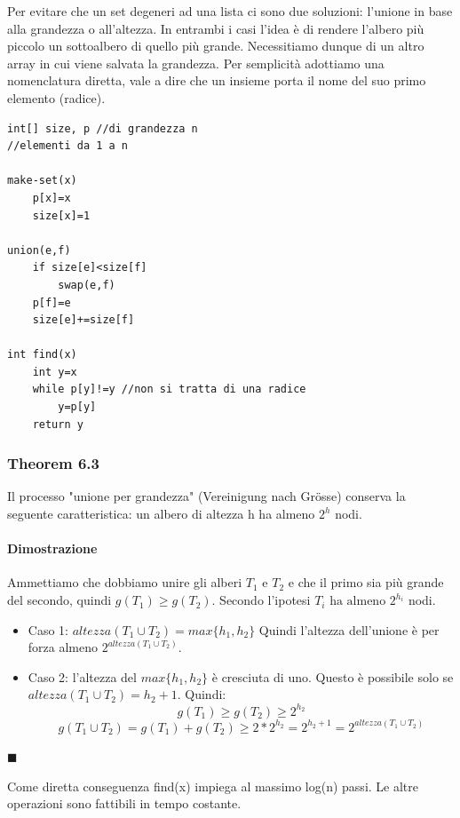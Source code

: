 \documentclass[a4paper]{book}
\newenvironment{mytheorem}[1]{\subsubsection*{Theorem #1}}{\begin{flushright}$\blacksquare$\end{flushright}}
\begin{document}
Per evitare che un set degeneri ad una lista ci sono due soluzioni: l'unione in base alla grandezza o all'altezza. In entrambi i casi l'idea è di rendere l'albero più piccolo un sottoalbero di quello più grande. Necessitiamo dunque di un altro array in cui viene salvata la grandezza. Per semplicità adottiamo una nomenclatura diretta, vale a dire che un insieme porta il nome del suo primo elemento (radice).
\begin{lstlisting}
int[] size, p //di grandezza n
//elementi da 1 a n

make-set(x)
	p[x]=x
	size[x]=1

union(e,f)
	if size[e]<size[f]
		swap(e,f)
	p[f]=e
	size[e]+=size[f]
	
int find(x)
	int y=x
	while p[y]!=y //non si tratta di una radice
		y=p[y]
	return y			
\end{lstlisting}
\begin{mytheorem}{6.3}
Il processo "unione per grandezza" (Vereinigung nach Grösse) conserva la seguente caratteristica: un albero di altezza h ha almeno $2^h$ nodi.
\paragraph*{Dimostrazione}
Ammettiamo che dobbiamo unire gli alberi $T_1 \mbox{ e } T_2$ e che il primo sia più grande del secondo, quindi $g(T_1)\geq g(T_2)$. Secondo l'ipotesi $T_i \mbox{ ha almeno } 2^{h_i}$ nodi. 
\begin{itemize}
\item Caso 1: $altezza(T_1 \cup T_2)=max\{h_1,h_2\}$
Quindi l'altezza dell'unione è per forza almeno $2^{altezza(T_1 \cup T_2)}$.
\item Caso 2: l'altezza del $max\{h_1,h_2\}$ è cresciuta di uno. Questo è possibile solo se $altezza(T_1 \cup T_2)=h_2+1$. Quindi:
$$g(T_1)\geq g(T_2) \geq 2^{h_2} $$
$$g(T_1 \cup T_2)=g(T_1)+g(T_2) \geq 2*2^{h_2}=2^{h_2+1}=2^{altezza(T_1 \cup T_2)}$$
\end{itemize}
\end{mytheorem}
Come diretta conseguenza find(x) impiega al massimo log(n) passi. Le altre operazioni sono fattibili in tempo costante.
\end{document}
